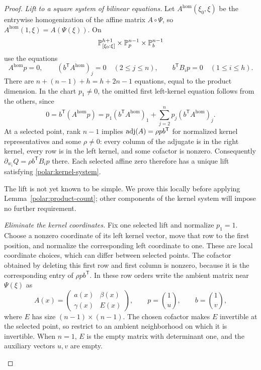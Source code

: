 \begin{proof}
\emph{Lift to a square system of bilinear equations.}
Let $A^{\mathrm{hom}}(\xi_0,\xi)$ be the entrywise homogenization of the affine matrix
$A\circ\Psi$, so $A^{\mathrm{hom}}(1,\xi)=A(\Psi(\xi))$. On
\[
 \mathbb P^{h+1}_{[\xi_0:\xi]}\times\mathbb P^{n-1}_p\times\mathbb P^{n-1}_b
\]
use the equations
\begin{equation}\label{polar:kernel-system}
 A^{\mathrm{hom}} p=0,\qquad
 (b^{\mathsf T}A^{\mathrm{hom}})_j=0\quad(2\le j\le n),\qquad
 b^{\mathsf T}B_i p=0\quad(1\le i\le h).
\end{equation}
There are $n+(n-1)+h=h+2n-1$ equations, equal to the product dimension.
In the chart $p_1\ne0$, the omitted first left-kernel equation follows
from the others, since
\[
 0=b^{\mathsf T}(A^{\mathrm{hom}} p)
   =p_1(b^{\mathsf T}A^{\mathrm{hom}})_1+
       \sum_{j=2}^n p_j(b^{\mathsf T}A^{\mathrm{hom}})_j.
\]
At a selected point, rank $n-1$ implies
$\operatorname{adj}(A)=\rho p b^{\mathsf T}$ for normalized kernel representatives
and some $\rho\ne0$: every column of the adjugate is in the right kernel,
every row is in the left kernel, and some cofactor is nonzero.
Consequently $\partial_{w_i}Q=\rho b^{\mathsf T}B_i p$ there.
Each selected affine zero therefore has a unique lift satisfying
\eqref{polar:kernel-system}.

The lift is not yet known to be simple. We prove this locally before
applying Lemma~\ref{polar:product-count}; other components of the kernel
system will impose no further requirement.

\begin{samepage}
\emph{Eliminate the kernel coordinates.}
Fix one selected lift and normalize $p_1=1$. Choose a nonzero coordinate
of its left kernel vector, move that row to the first position, and
normalize the corresponding left coordinate to one. These are local
coordinate choices, which can differ between selected points. The
cofactor obtained by deleting this first row and first column is nonzero,
because it is the corresponding entry of $\rho p b^{\mathsf T}$.
In these row orders write the ambient matrix near $\Psi(\xi)$ as
\[
 A(x)=\begin{pmatrix}a(x)&\beta(x)\\\gamma(x)&E(x)\end{pmatrix},
 \qquad
 p=\binom{1}{u},\qquad b=\binom{1}{v},
\]
where $E$ has size $(n-1)\times(n-1)$. The chosen cofactor makes $E$
invertible at the selected point, so restrict to an ambient neighborhood
on which it is invertible. When $n=1$, $E$ is the empty matrix with
determinant one, and the auxiliary vectors $u,v$ are empty.


\end{samepage}
\end{proof}
